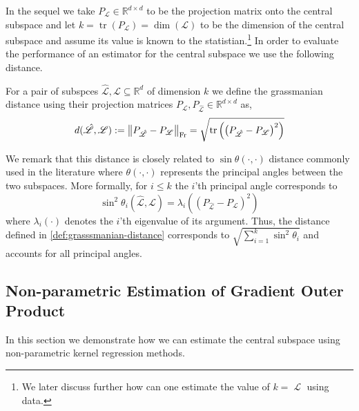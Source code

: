 In the sequel we take $P_{\mathscr{L}} \in \mathbb{R}^{d \times d}$ to be the projection matrix onto the central subspace and let $k = \operatorname{tr}(P_{\mathscr{L}}) = \operatorname{dim}(\mathscr{L})$ to be the dimension of the central subspace and assume its value is known to the statistian.\footnote{We later discuss further how can one estimate the value of $k = \operatorname{\mathscr{L}}$ using data.}
In order to evaluate the performance of an estimator for the central subspace we use the following distance.
\begin{definition}
    \label{def:grasssmanian-distance}
    For a pair of subspces $\hat{\mathscr{L}}, \mathscr{L} \subseteq \mathbb{R}^d$ of dimension $k$ we define the grassmanian distance using their projection matrices $P_{\mathscr{L}}, P_{\hat{\mathscr{L}}} \in \mathbb{R}^{d \times d}$ as,
    $$ d(\hat{\mathscr{L}}, \mathscr{L}) := \norm[\operatorname{Fr}]{ P_{\hat{\mathscr{L}}} - P_{\mathscr{L}} } = \sqrt{ \operatorname{tr}\left( \left( P_{\hat{\mathscr{L}}} - P_{\mathscr{L}} \right)^2 \right) } $$
\end{definition}
\begin{remark}
    We remark that this distance is closely related to $\sin \theta(\cdot, \cdot)$ distance commonly used in the literature where $\theta(\cdot, \cdot)$ represents the principal angles between the two subspaces. More formally, for $i \leq k$ the $i$'th principal angle corresponds to
    $$ \sin^2 \theta_i(\hat{\mathscr{L}} , \mathscr{L}) = \lambda_i\left( \left( P_{\hat{\mathscr{L}}} - P_{\mathscr{L}} \right)^2 \right) $$
    where $\lambda_i(\cdot)$ denotes the $i$'th eigenvalue of its argument. Thus, the distance defined in \ref{def:grasssmanian-distance} corresponds to $\sqrt{\sum_{i = 1}^{k} \sin^2 \theta_i}$ and accounts for all principal angles.
\end{remark}

\subsection{Non-parametric Estimation of Gradient Outer Product}
In this section we demonstrate how we can estimate the central subspace using non-parametric kernel regression methods.

